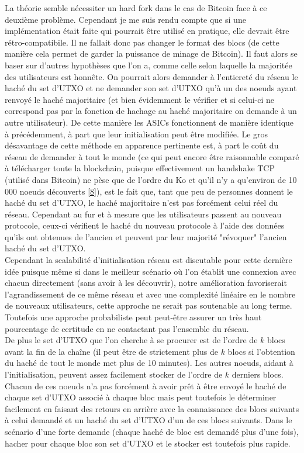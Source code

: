 \documentclass[12pt,a4paper]{article}
\newcommand{\source}[1]{\hyperlink{#1}{[#1]}}
\begin{document}
	La théorie semble nécessiter un hard fork dans le cas de Bitcoin face à ce deuxième problème. Cependant je me suis rendu compte que si une implémentation était faite qui pourrait être utilisé en pratique, elle devrait être rétro-compatibile. Il ne fallait donc pas changer le format des blocs (de cette manière cela permet de garder la puissance de minage de Bitcoin). Il faut alors se baser sur d'autres hypothèses que l'on a, comme celle selon laquelle la majoritée des utilisateurs est honnête. On pourrait alors demander à l'entiereté du réseau le haché du set d'UTXO et ne demander son set d'UTXO qu'à un des noeuds ayant renvoyé le haché majoritaire (et bien évidemment le vérifier et si celui-ci ne correspond pas par la fonction de hachage au haché majoritaire on demande à un autre utilisateur). De cette manière les ASICs fonctionnent de manière identique à précédemment, à part que leur initialisation peut être modifiée. Le gros désavantage de cette méthode en apparence pertinente est, à part le coût du réseau de demander à tout le monde (ce qui peut encore être raisonnable comparé à télécharger toute la blockchain, puisque effectivement un handshake TCP (utilisé dans Bitcoin) ne pèse que de l'ordre du Ko et qu'il n'y a qu'environ de 10 000 noeuds découverts \source{8}), est le fait que, tant que peu de personnes donnent le haché du set d'UTXO, le haché majoritaire n'est pas forcément celui réel du réseau. Cependant au fur et à mesure que les utilisateurs passent au nouveau protocole, ceux-ci vérifient le haché du nouveau protocole à l'aide des données qu'ils ont obtenues de l'ancien et peuvent par leur majorité "révoquer" l'ancien haché du set d'UTXO.\\ %
	Cependant la scalabilité d'initialisation réseau est discutable pour cette dernière idée puisque même si dans le meilleur scénario où l'on établit une connexion avec chacun directement (sans avoir à les découvrir), notre amélioration favoriserait l'agrandissement de ce même réseau et avec une complexité linéaire en le nombre de nouveaux utilisateurs, cette approche ne serait pas soutenable au long terme. Toutefois une approche probabiliste peut peut-être assurer un très haut pourcentage de certitude en ne contactant pas l'ensemble du réseau.\\
De plus le set d'UTXO que l'on cherche à se procurer est de l'ordre de $k$ blocs avant la fin de la chaîne (il peut être de strictement plus de $k$ blocs si l'obtention du haché de tout le monde met plus de 10 minutes). Les autres noeuds, aidant à l'initialisation, peuvent assez facilement stocker de l'ordre de $k$ derniers blocs. Chacun de ces noeuds n'a pas forcément à avoir prêt à être envoyé le haché de chaque set d'UTXO associé à chaque bloc mais peut toutefois le déterminer facilement en faisant des retours en arrière avec la connaissance des blocs suivants à celui demandé et un haché du set d'UTXO d'un de ces blocs suivants. Dans le scénario d'une forte demande (chaque haché de bloc est demandé plus d'une fois), hacher pour chaque bloc son set d'UTXO et le stocker est toutefois plus rapide.\\ %
\end{document}
